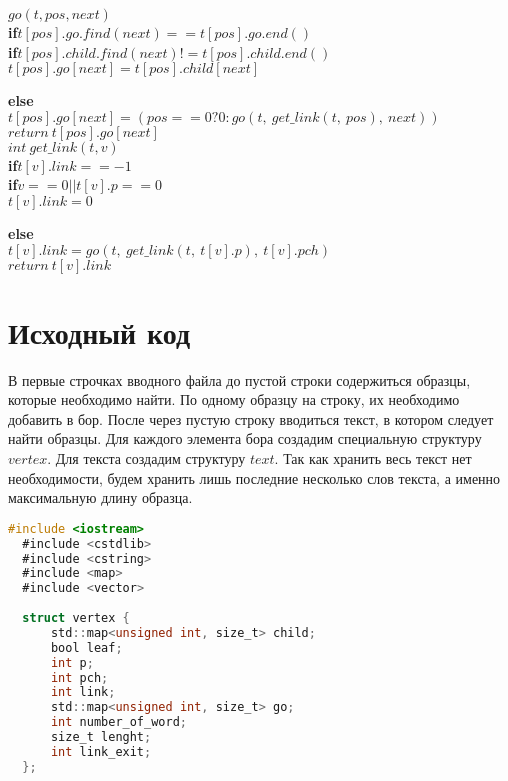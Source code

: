 \documentclass[pdf, unicode, 12pt, a4paper,oneside,fleqn]{article}
\begin{document}
    $go(t, pos, next)$\\
    \textbf{if}$ t[pos].go.find(next) == t[pos].go.end()$\\
    {\hspace*{0.5cm}\textbf{if}$ t[pos].child.find(next) != t[pos].child.end()$}\\
    {\hspace*{1cm}$ t[pos].go[next] = t[pos].child[next]$}\\
    {\hspace*{0.5cm}\textbf{else}\\
    {\hspace*{1cm}$ t[pos].go[next] = (pos == 0 ? 0 : go(t,\ get\_link(t,\ pos),\ next))$}\\
    $return\ t[pos].go[next]$\\

    $int\ get\_link(t, v)$\\
    \textbf{if}$ t[v].link == -1$\\
    {\hspace*{0.5cm}\textbf{if}$ v == 0 || t[v].p == 0$}\\
    {\hspace*{1cm}$ t[v].link = 0$}\\
    {\hspace*{0.5cm}\textbf{else}\\
    {\hspace*{1cm}$ t[v].link = go(t,\ get\_link(t,\ t[v].p),\ t[v].pch)$}\\
    $return\ t[v].link$\\
    \pagebreak
\section{Исходный код}

В первые строчках вводного файла до пустой строки содержиться образцы, которые необходимо найти.
По одному образцу на строку, их необходимо добавить в бор. После через пустую строку вводиться
текст, в котором следует найти образцы.
Для каждого элемента бора создадим специальную структуру $vertex$. Для текста создадим структуру
$text$. Так как хранить весь текст нет необходимости, будем хранить лишь последние несколько слов
текста, а именно максимальную длину образца. 

\begin{lstlisting}[language=C]
  #include <iostream>
  #include <cstdlib>
  #include <cstring>
  #include <map>
  #include <vector>
  
  struct vertex {
      std::map<unsigned int, size_t> child;
      bool leaf;
      int p;
      int pch;
      int link;
      std::map<unsigned int, size_t> go;
      int number_of_word;
      size_t lenght;
      int link_exit;
  };


\end{lstlisting}}}
\end{document}
